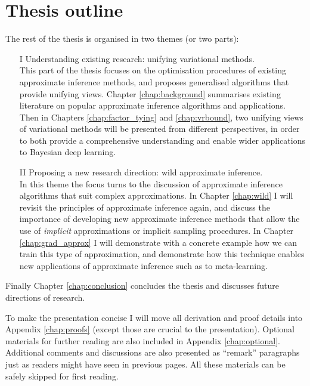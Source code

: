 \section{Thesis outline}
The rest of the thesis is organised in two themes (or two parts):

\begin{itemize}
\item[I] Understanding existing research: unifying variational methods. \\
This part of the thesis focuses on the optimisation procedures of existing approximate inference methods, and proposes generalised algorithms that provide unifying views. Chapter \ref{chap:background} summarises existing literature on popular approximate inference algorithms and applications. Then in Chapters \ref{chap:factor_tying} and \ref{chap:vrbound}, two unifying views of variational methods will be presented from different perspectives, in order to both provide a comprehensive understanding and enable wider applications to Bayesian deep learning.

\item[II] Proposing a new research direction: wild approximate inference. \\
In this theme the focus turns to the discussion of approximate inference algorithms that suit complex approximations. In Chapter \ref{chap:wild} I will revisit the principles of approximate inference again, and discuss the importance of developing new approximate inference methods that allow the use of \emph{implicit} approximations or implicit sampling procedures. In Chapter \ref{chap:grad_approx} I will demonstrate with a concrete example how we can train this type of approximation, and demonstrate how this technique enables new applications of approximate inference such as to meta-learning.
\end{itemize} 

Finally Chapter \ref{chap:conclusion} concludes the thesis and discusses future directions of research.

To make the presentation concise I will move all derivation and proof details into Appendix \ref{chap:proofs} (except those are crucial to the presentation). Optional materials for further reading are also included in Appendix \ref{chap:optional}. Additional comments and discussions are also presented as ``remark'' paragraphs just as readers might have seen in previous pages. All these materials can be safely skipped for first reading.

